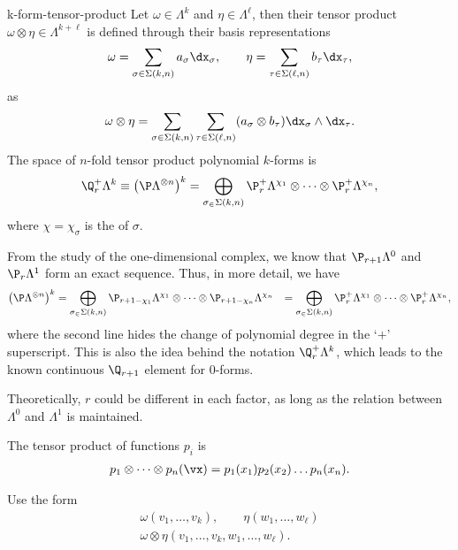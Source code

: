\begin{Definition}{k-form-tensor-product}
  Let $\omega\in \Lambda^k$ and $\eta\in\Lambda^\ell$, then their
  tensor product $\omega\otimes\eta\in\Lambda^{k+\ell}$ is defined through
  their basis representations
  \begin{gather}
    \omega = \sum_{\sigma\in\Sigma(k,n)} a_\sigma \dx_\sigma,
    \qquad
    \eta = \sum_{\tau\in\Sigma(\ell,n)} b_\tau \dx_\tau,
  \end{gather}
  as
  \begin{gather}
    \omega\otimes\eta = \sum_{\sigma\in\Sigma(k,n)}\sum_{\tau\in\Sigma(\ell,n)}
    (a_\sigma\otimes b_\tau) \dx_\sigma \wedge \dx_\tau.
  \end{gather}
  The space of $n$-fold tensor product polynomial $k$-forms is
  \begin{gather}
    \Q_r^+\Lambda^k \equiv
    \left(\P\Lambda^{\otimes n}\right)^k
    = \bigoplus_{\sigma_\in\Sigma(k,n)}
    \P_r^+\Lambda^{\chi_1} \otimes \dots \otimes \P_r^+\Lambda^{\chi_n},
  \end{gather}
  where $\chi= \chi_\sigma$ is the  of $\sigma$.
\end{Definition}

From the study of the one-dimensional complex, we know that
$\P_{r+1}\Lambda^0$ and $\P_r\Lambda^1$ form an exact sequence. Thus,
in more detail, we have
  \begin{align}
    \left(\P\Lambda^{\otimes n}\right)^k
    &= \bigoplus_{\sigma_\in\Sigma(k,n)}
      \P_{r+1-\chi_1}\Lambda^{\chi_1} \otimes \dots \otimes \P_{r+1-\chi_n}\Lambda^{\chi_n}
    &= \bigoplus_{\sigma_\in\Sigma(k,n)}
      \P_r^+ \Lambda^{\chi_1}\otimes \dots \otimes \P_r^+\Lambda^{\chi_n},
  \end{align}
  where the second line hides the change of polynomial degree in the
  `$+$' superscript. This is also the idea behind the notation
  $\Q_r^+\Lambda^k$, which leads to the known continuous $\Q_{r+1}$
  element for 0-forms.
  
  Theoretically, $r$ could be different in each factor, as long as the
  relation between $\Lambda^0$ and $\Lambda^1$ is maintained.

  The tensor product of functions $p_i$ is
  \begin{gather}
    p_1\otimes \dots\otimes p_n(\vx) = p_1(x_1) p_2(x_2)\dots p_n(x_n).
  \end{gather}

  
\begin{todo}
  Use the form
  \begin{gather}
    \omega(v_1,\dots,v_k), \qquad \eta(w_1,\dots,w_\ell)\\
    \omega\otimes \eta(v_1,\dots,v_k,w_1,\dots,w_\ell).
  \end{gather}
\end{todo}

